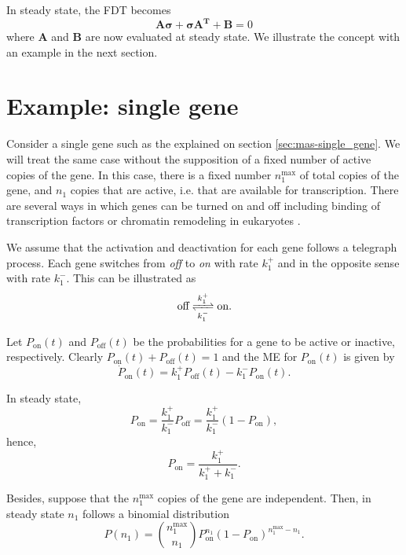 In steady state, the FDT becomes
\begin{equation}
  \label{eq:fdt-fdtss}
  \mathbf{A\sigma}+\mathbf{\sigma A^T}+\mathbf{B} = 0
\end{equation}
where $\mathbf{A}$ and $\mathbf{B}$ are now evaluated at steady state. We illustrate the concept with an example in the next section.

\section{Example: single gene}

Consider a single gene such as the explained on section \ref{sec:mas-single_gene}. We will treat the same case without the supposition of a fixed number of active copies of the gene. In this case, there is a fixed number $n_1^{\text{max}}$ of total copies of the gene, and $n_1$ copies that are active, i.e. that are available for transcription. There are several ways in which genes can be turned on and off including binding of transcription factors or chromatin remodeling in eukaryotes \cite{paulsson05}.

We assume that the activation and deactivation for each gene follows a telegraph process. Each gene switches from \textit{off} to \textit{on} with rate $k_1^+$ and in the opposite sense with rate $k_1^-$. This can be illustrated as
\begin{equation*}
  \text{off}\ce{<=>[k_1^+][k_1^-]}\text{on}.
\end{equation*}

Let $P_\text{on}(t)$ and $P_\text{off}(t)$ be the probabilities for a gene to be active or inactive, respectively. Clearly $P_\text{on}(t) + P_\text{off}(t) = 1$ and the ME for $P_\text{on}(t)$ is given by
\begin{equation*}
  \dot{P}_\text{on}(t)=k_1^+P_\text{off}(t)-k_1^-P_\text{on}(t).
\end{equation*}

In steady state,
\begin{equation*}
  P_\text{on} = \frac{k_1^+}{k_1^-}P_\text{off} = \frac{k_1^+}{k_1^-}(1-P_\text{on}),
\end{equation*}
hence,
\begin{equation*}
  P_\text{on} = \frac{k_1^+}{k_1^++k_1^-}.
\end{equation*}

Besides, suppose that the $n_1^\text{max}$ copies of the gene are independent. Then, in steady state $n_1$ follows a binomial distribution
\begin{equation*}
  P(n_1) = {n_1^\text{max}\choose n_1} P_\text{on}^{n_1}(1-P_\text{on})^{n_1^\text{max}-n_1}.
\end{equation*}

